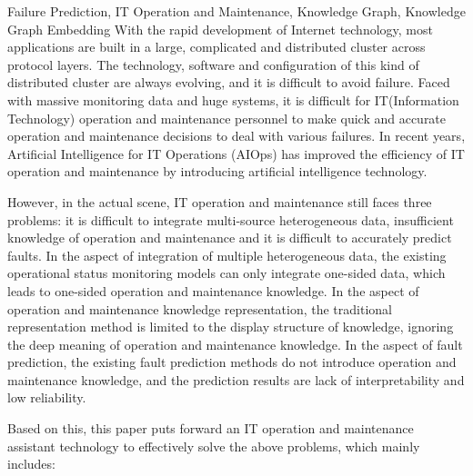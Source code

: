         


\begin{englishabstract}{Failure Prediction, IT Operation and Maintenance, Knowledge Graph, Knowledge Graph Embedding}
With the rapid development of Internet technology, most applications are built in a large, complicated and distributed cluster across protocol layers. The technology, software and configuration of this kind of distributed cluster are always evolving, and it is difficult to avoid failure. Faced with massive monitoring data and huge systems, it is difficult for IT(Information Technology) operation and maintenance personnel to make quick and accurate operation and maintenance decisions to deal with various failures. In recent years, Artificial Intelligence for IT Operations (AIOps) has improved the efficiency of IT operation and maintenance by introducing artificial intelligence technology. 

However, in the actual scene, IT operation and maintenance still faces three problems: it is difficult to integrate multi-source heterogeneous data, insufficient knowledge of operation and maintenance and it is difficult to accurately predict faults. In the aspect of integration of multiple heterogeneous data, the existing operational status monitoring models can only integrate one-sided data, which leads to one-sided operation and maintenance knowledge. In the aspect of operation and maintenance knowledge representation, the traditional representation method is limited to the display structure of knowledge, ignoring the deep meaning of operation and maintenance knowledge. In the aspect of fault prediction, the existing fault prediction methods do not introduce operation and maintenance knowledge, and the prediction results are lack of interpretability and low reliability. 

Based on this, this paper puts forward an IT operation and maintenance assistant technology to effectively solve the above problems, which mainly includes: 


\end{englishabstract}
